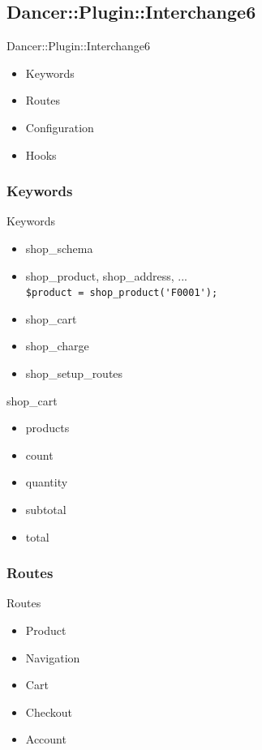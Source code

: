 \subsection{Dancer::Plugin::Interchange6}
\begin{frame}{Dancer::Plugin::Interchange6}
\begin{itemize}
\item Keywords
\item Routes
\item Configuration
\item Hooks
\end{itemize}
\end{frame}

\subsubsection{Keywords}
\begin{frame}[fragile]{Keywords}
\begin{itemize}
\item shop\_schema
\item shop\_product, shop\_address, ...\\
\verb|$product = shop_product('F0001');|
\item shop\_cart
\item shop\_charge
\item shop\_setup\_routes
\end{itemize}
\end{frame}

\begin{frame}[fragile]{shop\_cart}
\begin{itemize}
\item products
\item count
\item quantity
\item subtotal
\item total
\end{itemize}
\end{frame}

\subsubsection{Routes}
\begin{frame}{Routes}
\begin{itemize}
\item Product
\item Navigation
\item Cart
\item Checkout
\item Account
\end{itemize}
\end{frame}

